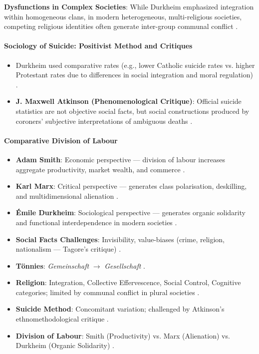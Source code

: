 \begin{CriticalPoint}
\textbf{Dysfunctions in Complex Societies}: While Durkheim emphasized integration within homogeneous clans, in modern heterogeneous, multi-religious societies, competing religious identities often generate inter-group communal conflict .
\end{CriticalPoint}

\paragraph{Sociology of Suicide: Positivist Method and Critiques}
\begin{itemize}
    \item Durkheim used comparative rates (e.g., lower Catholic suicide rates vs. higher Protestant rates due to differences in social integration and moral regulation) .
    \item \textbf{J. Maxwell Atkinson (Phenomenological Critique)}: Official suicide statistics are not objective social facts, but social constructions produced by coroners' subjective interpretations of ambiguous deaths .
\end{itemize}

\paragraph{Comparative Division of Labour}
\begin{itemize}
    \item \textbf{Adam Smith}: Economic perspective --- division of labour increases aggregate productivity, market wealth, and commerce .
    \item \textbf{Karl Marx}: Critical perspective --- generates class polarisation, deskilling, and multidimensional alienation .
    \item \textbf{\'Emile Durkheim}: Sociological perspective --- generates organic solidarity and functional interdependence in modern societies .
\end{itemize}

\begin{QuickRevision}
\begin{itemize}
    \item \textbf{Social Facts Challenges}: Invisibility, value-biases (crime, religion, nationalism --- Tagore's critique) .
    \item \textbf{T\"onnies}: \textit{Gemeinschaft} $\rightarrow$ \textit{Gesellschaft} .
    \item \textbf{Religion}: Integration, Collective Effervescence, Social Control, Cognitive categories; limited by communal conflict in plural societies .
    \item \textbf{Suicide Method}: Concomitant variation; challenged by Atkinson's ethnomethodological critique .
    \item \textbf{Division of Labour}: Smith (Productivity) vs. Marx (Alienation) vs. Durkheim (Organic Solidarity) .
\end{itemize}
\end{QuickRevision}

